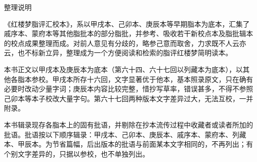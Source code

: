 \newpage

\begin{center}
{\Huge \heiti 整理说明}
\end{center}



《红楼梦脂评汇校本》，系以甲戌本、己卯本、庚辰本等早期脂本为底本，汇集了戚序本、蒙府本等其他脂批本的部分脂批，并参考、吸收若干新校点本及脂批辑本的校点成果整理而成。对前人意见有分歧的，略参己意而取舍，力求既不人云亦云，也不标新立异，整理成为一个方便阅读和检索的脂评红楼梦简明读本。

本书正文以甲戌本及庚辰本为底本（第六十四、六十七回以列藏本为底本），以其他各脂本参校。甲戌本所存十六回，文字显著优于他本，基本照录原文，只在确有必要时改动少量字词；庚辰本内容比较完整，惜抄写草率，错误甚多，不得不参照己卯本等本子校改大量字句。第六十七回两种版本文字差异过大，无法互校，一并附录。

本书辑录现存各脂本上的固有批语，并剔除在抄本流传过程中收藏者或读者所加的批语。批语按以下顺序辑录：甲戌本、己卯本、庚辰本、戚序本、蒙府本、列藏本、甲辰本。为节省篇幅，后出版本的批语与前面某本文字相同的，不再列出；有个别文字差异的，只据以参校，也不单独列出。

